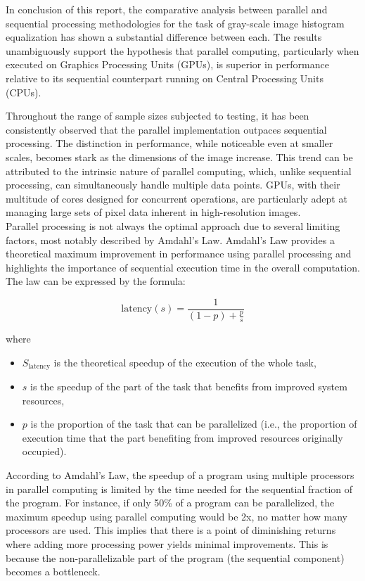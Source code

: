 \documentclass[10pt]{article}
\begin{document}
In conclusion of this report, the comparative analysis between parallel and sequential processing methodologies for the task of gray-scale image histogram equalization has shown a substantial difference between each. The results unambiguously support the hypothesis that parallel computing, particularly when executed on Graphics Processing Units (GPUs), is superior in performance relative to its sequential counterpart running on Central Processing Units (CPUs).

Throughout the range of sample sizes subjected to testing, it has been consistently observed that the parallel implementation outpaces sequential processing. The distinction in performance, while noticeable even at smaller scales, becomes stark as the dimensions of the image increase. This trend can be attributed to the intrinsic nature of parallel computing, which, unlike sequential processing, can simultaneously handle multiple data points. GPUs, with their multitude of cores designed for concurrent operations, are particularly adept at managing large sets of pixel data inherent in high-resolution images. \\
Parallel processing is not always the optimal approach due to several limiting factors, most notably described by Amdahl's Law. Amdahl's Law provides a theoretical maximum improvement in performance using parallel processing and highlights the importance of sequential execution time in the overall computation. The law can be expressed by the formula:


\begin{equation}
{\text{latency}}(s) = \frac{1}{(1 - p) + \frac{p}{s}}
\end{equation}

where
\begin{itemize}
\item \( S_{\text{latency}} \) is the theoretical speedup of the execution of the whole task,
\item \( s \) is the speedup of the part of the task that benefits from improved system resources,
\item \( p \) is the proportion of the task that can be parallelized (i.e., the proportion of execution time that the part benefiting from improved resources originally occupied).
\end{itemize}

\vspace{1cm}

According to Amdahl's Law, the speedup of a program using multiple processors in parallel computing is limited by the time needed for the sequential fraction of the program. For instance, if only 50\% of a program can be parallelized, the maximum speedup using parallel computing would be 2x, no matter how many processors are used. This implies that there is a point of diminishing returns where adding more processing power yields minimal improvements. This is because the non-parallelizable part of the program (the sequential component) becomes a bottleneck.







\pagebreak





\clearpage
\end{document}

